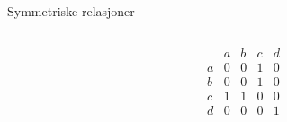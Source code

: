 \begin{frame}[fragile]{Symmetriske relasjoner}
\begin{columns}
\begin{column}{0.3\textwidth}
\begin{math}
            \end{math}
        \end{column}
        \begin{column}{0.3\textwidth}
            \begin{math}
                \begin{matrix}
                      & a & b & c & d\\
                    a & 0 & 0 & 1 & 0\\
                    b & 0 & 0 & 1 & 0\\
                    c & 1 & 1 & 0 & 0\\
                    d & 0 & 0 & 0 & 1
                \end{matrix}
            \end{math}
        \end{column}
    \end{columns}
\end{frame}

